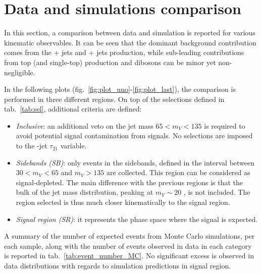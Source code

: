 \section{Data and simulations comparison}
\label{sec:datamc_comp}

In this section, a comparison between data and simulation is reported for various kinematic observables. It can be seen that the dominant background contribution comes from the \Z + jets and \W + jets production, while sub-leading contributions from top (\ttbar and single-top) production and dibosons can be minor yet non-negligible.

\noindent In the following plots (fig.~\ref{fig:plot_uno}-\ref{fig:plot_last}), the comparison is performed in three different regions. On top of the selections defined in tab.~\ref{tab:sel}, additional criteria are defined:
\begin{itemize}
  \item \textit{Inclusive}: an additional veto on the jet mass $65 < m_V < 135$ \GeV is required to avoid potential signal contamination from \VZ signals. No selections are imposed to the \V-jet $\tau_{21}$ variable.
  \item \textit{Sidebands (SB)}: only events in the sidebands, defined in the interval between $30 < m_V < 65$ \GeV and $m_V > 135$ \GeV are collected. This region can be considered as signal-depleted. The main difference with the previous regions is that the bulk of the jet mass distribution, peaking at $m_V \sim 20$ \GeV, is not included. The region selected is thus much closer kinematically to the signal region.
  \item \textit{Signal region (SR)}: it represents the phase space where the signal is expected. %
\end{itemize}

\noindent A summary of the number of expected events from Monte Carlo simulations, per each sample, along with the number of events observed in data in each category is reported in tab.~\ref{tab:event_number_MC}. No significant excess is observed in data distributions with regards to simulation predictions in signal region.

